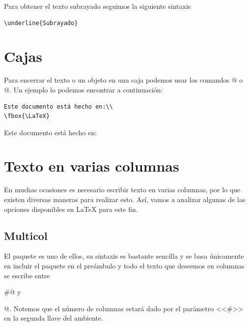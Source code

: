 \documentclass[a4,10pt]{aleph-notas}
\begin{document}
Para obtener el texto subrayado seguimos la siguiente sintaxis

\begin{lstlisting}[frame=single]
\underline{Subrayado}
\end{lstlisting}

\begin{center}
{ \fboxsep 12pt
 }
\end{center}


\section{Cajas}

Para encerrar el texto o un objeto en una caja podemos usar los comandos \verb@{}@ o \verb@{}@. Un ejemplo lo podemos encontrar a continuación:

\begin{lstlisting}[frame=single]
Este documento está hecho en:\\
\fbox{\LaTeX}
\end{lstlisting}

\begin{center}
Este documento está hecho en:\\
\fbox{\LaTeX}
\end{center}

\section{Texto en varias columnas}

En muchas ocasiones es necesario escribir texto en varias columnas, por lo que existen diversas maneras para realizar esto. Así, vamos a analizar algunas de las opciones disponibles en \LaTeX{} para este fin.

\subsection{Multicol}

El paquete \verb@\multicol@ es uno de ellos, su sintaxis es bastante sencilla y se basa únicamente en incluir el paquete en el preámbulo y todo el texto que deseemos en columnas se escribe entre  \verb@\begin{multicol}{#}@ y \verb@\end{multicol}@. Notemos que el número de columnas estará dado por el parámetro <<\#>> en la segunda llave del ambiente.
\end{document}
